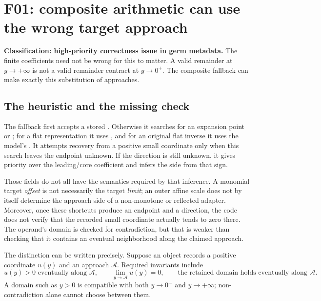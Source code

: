 \section{F01: composite arithmetic can use the wrong target approach}\label{sec:f01}

\textbf{Classification: high-priority correctness issue in germ metadata.} The finite coefficients need not be wrong for this to matter. A valid remainder at $y\to+\infty$ is not a valid remainder contract at $y\to0^+$. The composite fallback can make exactly this substitution of approaches.


\subsection{The heuristic and the missing check}

The fallback first accepts a stored . Otherwise it searches for an expansion point or ; for a flat representation it uses , and for an original flat inverse it uses the model's . It attempts recovery from a positive small coordinate only when this search leaves the endpoint unknown. If the direction is still unknown, it gives  priority over the leading/core coefficient and infers the side from that sign.\cite{envelope}

Those fields do not all have the semantics required by that inference. A monomial target \emph{offset} is not necessarily the target \emph{limit}; an outer affine scale does not by itself determine the approach side of a non-monotone or reflected adapter. Moreover, once these shortcuts produce an endpoint and a direction, the code does not verify that the recorded small coordinate actually tends to zero there. The operand's domain is checked for contradiction, but that is weaker than checking that it contains an eventual neighborhood along the claimed approach.\cite{envelope}

The distinction can be written precisely. Suppose an object records a positive coordinate $u(y)$ and an approach $\mathcal A$. Required invariants include
\begin{equation}\label{eq:approach-invariant}
 u(y)>0\text{ eventually along }\mathcal A,
 \qquad \lim_{y\to\mathcal A}u(y)=0,
 \qquad \text{the retained domain holds eventually along }\mathcal A.
\end{equation}
A domain such as $y>0$ is compatible with both $y\to0^+$ and $y\to+\infty$; non-contradiction alone cannot choose between them.

